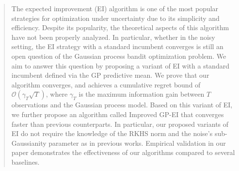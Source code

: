 \documentclass[twoside]{article}
\begin{document}
%

%


\begin{abstract}
The expected improvement (EI) algorithm is one of the most popular strategies for optimization under uncertainty due to its simplicity and efficiency. Despite its popularity, the theoretical aspects of this algorithm have not been properly analyzed. In particular, whether in the noisy setting, the EI strategy with a standard incumbent converges is still an open question of the Gaussian process bandit optimization problem. We aim to answer this question by proposing a variant of EI with a standard incumbent defined via the GP predictive mean. We prove that our algorithm converges, and achieves a cumulative regret bound of $\mathcal O(\gamma_T\sqrt{T})$, where $\gamma_T$ is the maximum information gain between $T$ observations and the Gaussian process model. Based on this variant of EI, we further propose an algorithm called Improved GP-EI that converges faster than previous counterparts. In particular, our proposed variants of EI do not require the knowledge of the RKHS norm and the noise's sub-Gaussianity parameter as in previous works. Empirical validation in our paper demonstrates the effectiveness of our algorithms compared to several baselines.
\end{abstract}
\end{document}
